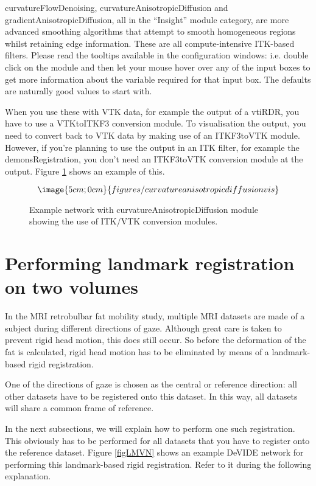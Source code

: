 curvatureFlowDenoising, curvatureAnisotropicDiffusion and
gradientAnisotropicDiffusion, all in the ``Insight'' module category,
are more advanced smoothing algorithms that attempt to smooth
homogeneous regions whilst retaining edge information.  These are all
compute-intensive ITK-based filters.  Please read the tooltips
available in the configuration windows: i.e. double click on the
module and then let your mouse hover over any of the input boxes to
get more information about the variable required for that input box.
The defaults are naturally good values to start with.

When you use these with VTK data, for example the output of a vtiRDR,
you have to use a VTKtoITKF3 conversion module.  To visualisation the
output, you need to convert back to VTK data by making use of an
ITKF3toVTK module.  However, if you're planning to use the output in
an ITK filter, for example the demonsRegistration, you don't need an
ITKF3toVTK conversion module at the output.  Figure \ref{figCADvis}
shows an example of this.

\begin{figure}
$$\image{5cm;0cm}{figures/curvatureanisotropicdiffusionvis}$$
\caption{Example network with curvatureAnisotropicDiffusion module
showing the use of ITK/VTK conversion modules.}\label{figCADvis}
\end{figure}
\section{Performing landmark registration on two volumes}
In the MRI retrobulbar fat mobility study, multiple MRI datasets are
made of a subject during different directions of gaze.  Although great
care is taken to prevent rigid head motion, this does still occur.  So
before the deformation of the fat is calculated, rigid head motion has
to be eliminated by means of a landmark-based rigid registration.

One of the directions of gaze is chosen as the central or reference
direction: all other datasets have to be registered onto this dataset.
In this way, all datasets will share a common frame of reference.

In the next subsections, we will explain how to perform one such
registration.  This obviously has to be performed for all datasets
that you have to register onto the reference dataset.  Figure
\ref{figLMVN} shows an example DeVIDE network for performing this
landmark-based rigid registration.  Refer to it during the following
explanation.

